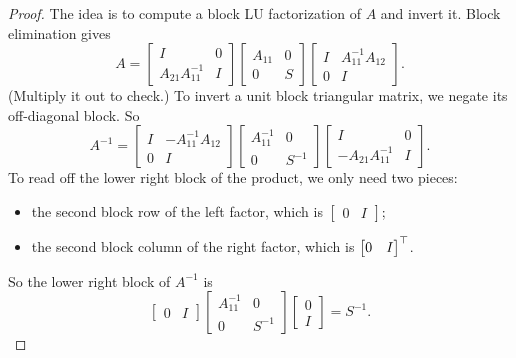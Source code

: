 \begin{proof}
  The idea is to compute a block LU factorization of $A$ and invert it. Block elimination gives
  \begin{equation}
    A = \begin{bmatrix} I & 0 \\ A_{21}A_{11}^{-1} & I \end{bmatrix}\begin{bmatrix} A_{11} & 0 \\ 0 & S \end{bmatrix}\begin{bmatrix} I & A_{11}^{-1}A_{12} \\ 0 & I \end{bmatrix}.
  \end{equation}
  (Multiply it out to check.) To invert a unit block triangular matrix, we negate its off-diagonal block. So
  \begin{equation}
    A^{-1} = \begin{bmatrix} I & -A_{11}^{-1}A_{12} \\ 0 & I \end{bmatrix}\begin{bmatrix} A_{11}^{-1} & 0 \\ 0 & S^{-1} \end{bmatrix}\begin{bmatrix} I & 0 \\ -A_{21}A_{11}^{-1} & I \end{bmatrix}.
  \end{equation}
  To read off the lower right block of the product, we only need two pieces:
  \begin{itemize}
    \item the second block row of the left factor, which is $\begin{bmatrix} 0 & I \end{bmatrix}$;
    \item the second block column of the right factor, which is $\begin{bmatrix} 0 & I \end{bmatrix}^\top$.
  \end{itemize}
  So the lower right block of $A^{-1}$ is
  \begin{equation*}
    \begin{bmatrix} 0 & I \end{bmatrix}\begin{bmatrix} A_{11}^{-1} & 0 \\ 0 & S^{-1} \end{bmatrix}\begin{bmatrix} 0 \\ I \end{bmatrix} = S^{-1}.
  \end{equation*}
\end{proof}

